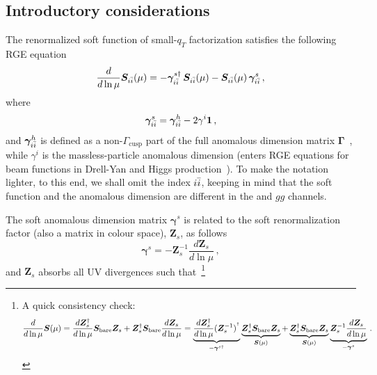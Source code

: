 \documentclass[a4paper,11pt]{report}
\numberwithin{equation}{section}
\newcommand{\bfS}{\bm{S}}
\newcommand{\bfZ}{\bm{Z}}
\newcommand{\bfgamma}{\bm{\gamma}}
\newcommand{\bfGamma}{\bm{\Gamma}}
\newcommand{\bfI}{\bm{1}}
\begin{document}
\subsection{Introductory considerations}

The renormalized soft function of small-$q_T$ factorization satisfies the
following RGE equation~\cite{Zhu:2012ts}
%
\begin{equation}
  \frac{d}{d\ln \mu} \bfS_\iibar (\mu) =
  - \bfgamma^{s \dagger}_\iibar \,\bfS_\iibar (\mu)  
  - \bfS_\iibar (\mu)\, \bfgamma^{s}_\iibar \,,
  \label{eq:SF-RGE-main}
\end{equation}
%
where
%
\begin{equation}
  \bfgamma^{s}_\iibar = \bfgamma^{h}_\iibar - 2 \gamma^{i} \bfI\,,
\end{equation}
%
and $\bfgamma^{h}_\iibar$ is defined as a non-$\Gamma_\text{cusp}$ part of the
full anomalous dimension matrix $\bfGamma$~\cite{Ahrens:2010zv}, while
$\gamma^{i}$ is the massless-particle anomalous dimension (enters RGE
equations for beam functions in Drell-Yan and Higgs
production~\cite{Becher:2010tm, Becher:2012yn}). To make the notation lighter, to
this end, we shall omit the index ${i \bar i}$, keeping in mind that the soft
function and the anomalous dimension are different in the \qqbar and $gg$
channels.

The soft anomalous dimension matrix $\bfgamma^{s}$ is related to the soft
renormalization factor (also a matrix in colour space), $\bfZ_s$, as follows
%
\begin{equation}
  \bfgamma^{s} = - \bfZ_s^{-1}\frac{d\bfZ_s}{d\ln \mu}\,,
\end{equation}
%
and $\bfZ_s$ absorbs all UV divergences such that~\footnote{
A quick consistency check:
%
\begin{eqnarray}
  \frac{d}{d\ln \mu} \bfS(\mu) 
  = 
  \frac{d\bfZ^\dagger_s}{d\ln\mu} \bfS_\bare \bfZ_s +
  \bfZ^\dagger_s \bfS_\bare \frac{d\bfZ_s}{d\ln\mu}
  =
  \underbrace{\frac{d\bfZ^\dagger_s}{d\ln\mu}
  (\bfZ^{-1}_s)^{^\dagger}}_{-\bfgamma^{s \dagger}}
  \underbrace{\bfZ^\dagger_s \bfS_\bare \bfZ_s}_{\bfS(\mu)}
  +
  \underbrace{\bfZ^\dagger_s \bfS_\bare \bfZ_s}_{\bfS(\mu)}
  \underbrace{\bfZ_s^{-1} \frac{d\bfZ_s}{d\ln\mu}} _{-\bfgamma^{s }}\,.
\end{eqnarray}
}
\end{document}
